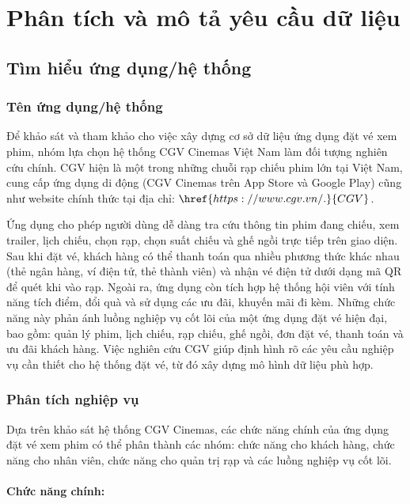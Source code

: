 \documentclass[a4paper]{article}
\newcommand{\cach}{\hspace*{1.5em}\ignorespaces}
\begin{document}
\pagebreak
\section{Phân tích và mô tả yêu cầu dữ liệu}
\subsection{Tìm hiểu ứng dụng/hệ thống}
\subsubsection{Tên ứng dụng/hệ thống}
\cach Để khảo sát và tham khảo cho việc xây dựng cơ sở dữ liệu ứng dụng đặt vé xem phim, nhóm lựa chọn hệ thống CGV Cinemas Việt Nam làm đối tượng nghiên cứu chính. CGV hiện là một trong những chuỗi rạp chiếu phim lớn tại Việt Nam, cung cấp ứng dụng di động (CGV Cinemas trên App Store và Google Play) cũng như website chính thức tại địa chỉ: $\href{https://www.cgv.vn/.}{CGV}$.


\indent Ứng dụng cho phép người dùng dễ dàng tra cứu thông tin phim đang chiếu, xem trailer, lịch chiếu, chọn rạp, chọn suất chiếu và ghế ngồi trực tiếp trên giao diện. Sau khi đặt vé, khách hàng có thể thanh toán qua nhiều phương thức khác nhau (thẻ ngân hàng, ví điện tử, thẻ thành viên) và nhận vé điện tử dưới dạng mã QR để quét khi vào rạp. Ngoài ra, ứng dụng còn tích hợp hệ thống hội viên với tính năng tích điểm, đổi quà và sử dụng các ưu đãi, khuyến mãi đi kèm. Những chức năng này phản ánh luồng nghiệp vụ cốt lõi của một ứng dụng đặt vé hiện đại, bao gồm: quản lý phim, lịch chiếu, rạp chiếu, ghế ngồi, đơn đặt vé, thanh toán và ưu đãi khách hàng. Việc nghiên cứu CGV giúp định hình rõ các yêu cầu nghiệp vụ cần thiết cho hệ thống đặt vé, từ đó xây dựng mô hình dữ liệu phù hợp.
\subsubsection{Phân tích nghiệp vụ}
\cach Dựa trên khảo sát hệ thống CGV Cinemas, các chức năng chính của ứng dụng đặt vé xem phim có thể phân thành các nhóm: chức năng cho khách hàng, chức năng cho nhân viên, chức năng cho quản trị rạp và các luồng nghiệp vụ cốt lõi.
\\
\\
\cach \textbf{Chức năng chính:}
\end{document}
